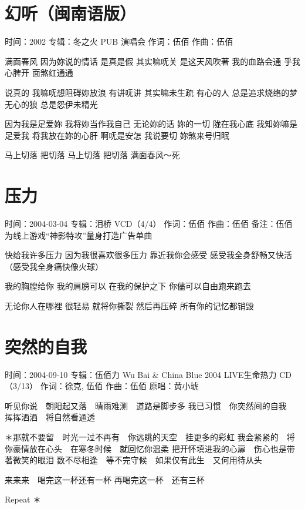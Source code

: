 \documentclass[UTF8,a4paper,oneside,twocolumn,12pt]{ctexbook}
\newcommand{\infopair}[2]{\textbullet #1：#2}
\newcommand{\zc}[1][伍佰]{\infopair{作词}{#1}}
\newcommand{\zq}[1][伍佰]{\infopair{作曲}{#1}}
\newcommand{\zj}[1]{\infopair{专辑}{#1}}
\newcommand{\yc}[1]{\infopair{原唱}{#1}}
\newcommand{\sj}[1]{\infopair{时间}{#1}}
\newcommand{\bz}[1]{\infopair{备注}{#1}}
\newenvironment{info}{\begin{flushleft}\kaishu
	}
	{\end{flushleft}\normalsize\yahei\par}
\newenvironment{lyric}{
	}
{}
\begin{document}
\section{幻听（闽南语版）}
\begin{info}
	\sj{2002}
	\zj{冬之火 PUB 演唱会}
	\zc
	\zq
\end{info}
\begin{lyric}
	满面春风 因为妳说的情话 是真是假 其实嘛呒关
	是这天风吹著 我的血路会通 乎我心脾开 面煞红通通

	说真的 我嘛呒想阻碍妳放浪 有讲呒讲 其实嘛未生疏
	有心的人 总是追求烧络的梦 无心的狼 总是怨伊未精光

	因为我是足爱妳 我将妳当作我自己 无论妳的话 妳的一切 陇在我心底
	我知妳嘛是足爱我 将我放在妳的心肝 啊呒是安怎 我说要切 妳煞来号归眠

	马上切落 把切落 马上切落 把切落 满面春风～死
\end{lyric}

\section{压力}
\begin{info}
	\sj{2004-03-04}
	\zj{泪桥 VCD（4/4）}
	\zc
	\zq
	\bz{伍佰为线上游戏“神影特攻”量身打造广告单曲}
\end{info}
\begin{lyric}
	快给我许多压力
	因为我很喜欢很多压力
	靠近我你会感受
	感受我全身舒畅又快活（感受我全身痛快像火球）

	我的胸膛给你
	我的肩膀可以
	在我的保护之下
	你儘可以自由跑来跑去

	无论你人在哪裡
	很轻易
	就将你撕裂
	然后再压碎
	所有你的记忆都销毁
\end{lyric}

\section{突然的自我}
\begin{info}
	\sj{2004-09-10}
	\zj{伍佰力 Wu Bai \& China Blue 2004 LIVE生命热力 CD（3/13）}
	\zc[徐克, 伍佰]
	\zq
	\yc{黄小琥}
\end{info}
\begin{lyric}
	听见你说　朝阳起又落　晴雨难测　道路是脚步多
	我已习惯　你突然间的自我　挥挥洒洒　将自然看通透

	＊那就不要留　时光一过不再有　你远眺的天空　挂更多的彩虹
	我会紧紧的　将你豪情放在心头　在寒冬时候　就回忆你温柔
	把开怀填进我的心扉　伤心也是带著微笑的眼泪
	数不尽相逢　等不完守候　如果仅有此生　又何用待从头

	来来来　喝完这一杯还有一杯
	再喝完这一杯　还有三杯

	Repeat ＊
\end{lyric}
\end{document}
